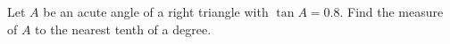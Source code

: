 Let $A$ be an acute angle of a right triangle with $\tan A=0.8$. Find the measure of $A$ to the nearest tenth of a degree.
